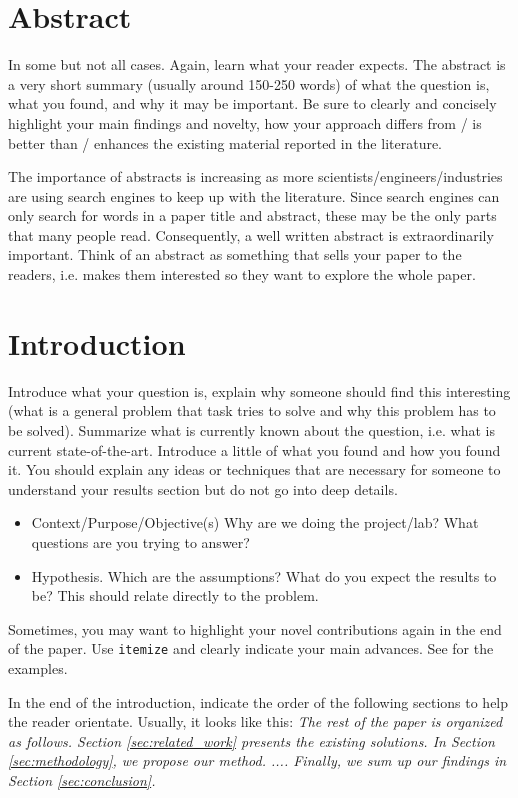 \documentclass[10pt,conference,compsocconf]{IEEEtran}
\begin{document}
\section*{Abstract}
In some but not all cases. Again, learn what your reader expects. The abstract is a very short summary (usually around 150-250 words) of what the question is, what you found, and why it may be important. Be sure to clearly and concisely highlight your main findings and novelty, how your approach differs from / is better than / enhances the existing material reported in the literature.

The importance of abstracts is increasing as more scientists/engineers/industries are using search engines to keep up with the literature. Since search engines can only search for words in a paper title and abstract, these may be the only parts that many people read. Consequently, a well written abstract is extraordinarily important. Think of an abstract as something that sells your paper to the readers, i.e. makes them interested so they want to explore the whole paper.

\section{Introduction}\label{sec:introduction}

Introduce what your question is, explain why someone should find this interesting (what is a general problem that task tries to solve and why this problem has to be solved). Summarize what is currently known about the question, i.e. what is current state-of-the-art. Introduce a little of what you found and how you found it. You should explain any ideas or techniques that are necessary for someone to understand your results section but do not go into deep details.
\begin{itemize}
	\item Context/Purpose/Objective(s) Why are we doing the project/lab? What questions are you trying to answer?
	\item Hypothesis. Which are the assumptions? What do you expect the results to be? This should relate directly to the problem.
\end{itemize}

Sometimes, you may want to highlight your novel contributions again in the end of the paper. Use \texttt{itemize} and clearly indicate your main advances. See \cite{pegg2023rtfs, huang2022you} for the examples.

In the end of the introduction, indicate the order of the following sections to help the reader orientate. Usually, it looks like this: \textit{The rest of the paper is organized as follows. Section \ref{sec:related_work} presents the existing solutions. In Section \ref{sec:methodology}, we propose our method. .... Finally, we sum up our findings in Section \ref{sec:conclusion}.}
\end{document}
